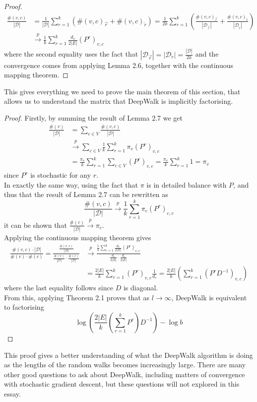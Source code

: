 \documentclass[a4paper]{article}
\newcommand{\D}{\mathcal D}
\newcommand{\rar}{\overrightarrow r}
\newcommand{\lar}{\overleftarrow r}
\begin{document}
\begin{proof}
  \begin{align*}
    \frac{\#(v, c)}{|\D|} &=  \frac{1}{|\D|}\sum_{r=1}^k (\#(v, c)_{\rar} + \#(v, c)_{\lar})= \frac{1}{2k} \sum_{r=1}^k \left( \frac{\#(v, c)_{\rar}}{|\D_{\rar}|} + \frac{\#(v, c)_{\lar}}{|\D_{\lar}|} \right)\\
                          &\overset{p}{\longrightarrow} \frac{1}{k}\sum_{r=1}^{k} \frac{d_v}{2|E|}(P^r)_{v, c}
  \end{align*}
  where the second equality uses the fact that $|\D_{\rar}| = |\D_{\lar}| =
  \frac{|\D|}{2k}$ and the convergence comes from applying Lemma 2.6,
  together with the continuous mapping theorem.
\end{proof}
This gives everything we need to prove the main theorem of this section, that
allows us to understand the matrix that DeepWalk is implicitly factorising.
\MainDeepWalk*
\begin{proof}
  Firstly, by summing the result of Lemma 2.7 we get
  \begin{align*}
    \frac{\#(v)}{|\D|} &= \sum_{c \in V}\frac{\#(v, c)}{|\D|}\\
                       &\overset{p}{\longrightarrow} \sum_{c \in V} \frac{1}{k}\sum_{r=1}^k \pi_v(P^r)_{v, c}\\
                       &=\frac{\pi_v}{k}\sum_{r = 1}^k \sum_{c \in V}(P^r)_{v,c} = \frac{\pi_v}{k}\sum_{r = 1}^k 1 = \pi_v
  \end{align*}
  since $P^r$ is stochastic for any $r$.\\
In exactly the same way, using the fact that $\pi$ is in detailed balance with $P$, and thus that
  the result of Lemma 2.7 can be rewritten as
  \[\frac{\#(v, c)}{|\D|} \overset{p}{\longrightarrow} \frac{1}{k} \sum_{r = 1}^k \pi_c
    (P^r)_{c,v}\]
  it can be shown that $\frac{\#(c)}{|\D|} \overset{p}{\longrightarrow} \pi_c$.\\
  Applying the continuous mapping theorem gives
  \begin{align*}
    \frac{\#(v, c) \cdot |\D|}{\#(v) \cdot \#(c)} = \frac{\frac{\#(v,c)}{|\D|}}{\frac{\#(v)}{|\D|} \cdot \frac{\#(c)}{|\D|}} & \overset{p}{\longrightarrow} \frac{\frac{1}{k}\sum_{r=1}^{k} \frac{d_v}{2|E|}(P^r)_{v, c}}{\frac{d_v}{2|E|} \cdot \frac{d_c}{2|E|}}\\
                                                                                                                             &=\frac{2|E|}{k}\sum_{r=1}^k (P^r)_{v,c} \frac{1}{d_c} = \frac{2|E|}{k}\left( \sum_{r=1}^k(P^rD^{-1})_{v,c} \right)
  \end{align*}
  where the last equality follows since $D$ is diagonal.\\
  From this, applying Theorem 2.1 proves that as $l \to \infty$, DeepWalk is equivalent to
  factorising
  \[\log \left( \frac{2|E|}{k}\left( \sum_{r=1}^k P^r \right)D^{-1}\right) - \log{b}\]
\end{proof}
\noindent This proof gives a better understanding of what the DeepWalk algorithm is doing as the lengths of the random walks becomes increasingly large.
There are many other good questions to ask about DeepWalk, including matters of convergence with stochastic gradient descent, but
these questions will not explored in this essay.
\end{document}
